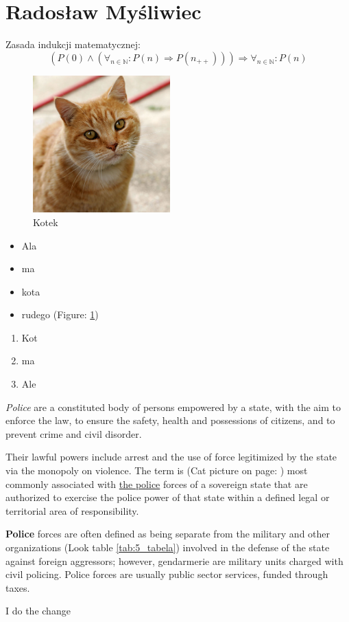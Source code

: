 \section {Radosław Myśliwiec}

Zasada indukcji matematycznej:
$$ (P(0) \land (\forall_{n \in \mathbb{N}} : P(n) \Rightarrow P(n_{++}))) 
\Rightarrow \forall_{n \in \mathbb{N}} : P(n) $$

\begin{figure} [htpb]
    \centering
    \includegraphics[width=200px]{pictures/cat.jpg}
    \caption{Kotek}
    \label{kot}
\end{figure}



\begin{itemize}
    \item Ala
    \item ma
    \item kota
    \item rudego (Figure: \ref{kot})
\end{itemize}

\begin{enumerate}
    \item Kot
    \item ma
    \item Ale
\end{enumerate}

\emph{Police} are a constituted body of persons empowered by a state, with the aim 
to enforce the law, to ensure the safety, health and possessions of citizens, 
and to prevent crime and civil disorder.

Their lawful powers include arrest and the use of force legitimized by the 
state via the monopoly on violence. The term is (Cat picture on page: \pageref{kot}) 
most commonly associated with 
\underline{the police} forces of a sovereign state that are authorized to exercise the police 
power of that state within a defined legal or territorial area of responsibility. 

\textbf{Police} forces are often defined as being separate from the military and 
other organizations (Look table \ref{tab:5_tabela}) involved in the defense of the 
state against foreign 
aggressors; however, gendarmerie are military units charged with civil policing. 
Police forces are usually public sector services, funded through taxes.

I do the change